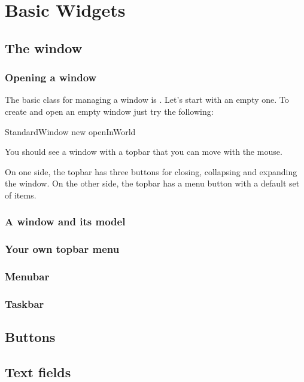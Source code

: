 \documentclass[a4paper,10pt,twoside]{book}
\begin{document}
\fi
\sloppy

\chapter{Basic Widgets}

\section{The window}
\subsection{Opening a window}
The basic class for managing a window is . Let's start with an empty one. To create and open an empty window just try the following:
\begin{code}{}
StandardWindow new openInWorld
\end{code}
You should see a window with a topbar that you can move with the mouse. 

On one side, the topbar has three buttons for closing, collapsing and expanding the window. On the other side, the topbar has a menu button with a default set of items.

\subsection{A window and its model}

\subsection{Your own topbar menu}

\subsection{Menubar}

\subsection{Taskbar}

\section{Buttons}

\section{Text fields}
\end{document}
